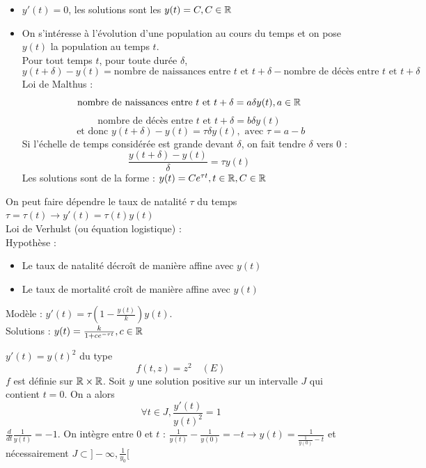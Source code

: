 \documentclass[]{report}
\begin{document}
\begin{ex}
    \begin{itemize}
        \item $y'(t)=0$, les solutions sont les $y(t)=C,C\in\mathbb{R}$
        \item 
        On s'intéresse à l'évolution d'une population au cours du temps et on pose $y(t)$ la population au temps $t$.\\
        Pour tout temps $t$, pour toute durée $\delta$, $$y(t+\delta)-y(t)=\text{nombre de naissances entre $t$ et $t+\delta$}-\text{nombre de décès entre $t$ et $t+\delta$}$$
        Loi de Malthus : $$\text{nombre de naissances entre $t$ et $t+\delta$}=a \delta y(t),a\in\mathbb{R}$$
        $$\text{nombre de décès entre $t$ et $t+\delta$}=b\delta y(t)$$
        $$\text{ et donc } y(t+\delta)-y(t)=\tau\delta y(t),\text{ avec }\tau=a-b$$
        Si l'échelle de temps considérée est grande devant $\delta$, on fait tendre $\delta$ vers $0$ :
        $$\frac{y(t+\delta)-y(t)}{\delta}=\tau y(t)$$
        Les solutions sont de la forme : $y(t)=Ce^{\tau t},t\in\mathbb{R},C\in\mathbb{R}$
    \end{itemize}
\end{ex}

\begin{re}
    On peut faire dépendre le taux de natalité $\tau$ du temps $\tau=\tau(t)\to y'(t)=\tau(t) y(t)$\\
    Loi de Verhulst (ou équation logistique) :\\
    Hypothèse :\begin{itemize}
        \item Le taux de natalité décroît de manière affine avec $y(t)$
        \item Le taux de mortalité croît de manière affine avec $y(t)$
    \end{itemize}
    Modèle : $y'(t)=\tau\left(1-\frac{y(t)}{k}\right)y(t)$.\\
    Solutions : $y(t)=\frac{k}{1+ce^{-\tau t}},c\in\mathbb{R}$
\end{re}

\begin{ex}
    $y'(t)=y(t)^2$ du type $$f(t,z)=z^2\quad (E)$$
    $f$ est définie sur $\mathbb{R}\times \mathbb{R}$. Soit $y$ une solution positive sur un intervalle $J$ qui contient $t=0$. On a alors $$\forall t\in J,\frac{y'(t)}{y(t)^2}=1$$
    $\frac{d}{dt}\frac{1}{y(t)}=-1$. On intègre entre $0$ et $t$ : $\frac{1}{y(t)}-\frac{1}{y(0)}=-t\longrightarrow y(t)=\frac{1}{\frac{1}{y(0)}-t}$ et nécessairement $J\subset ]-\infty,\frac{1}{y_0}[$
\end{ex}
\end{document}
